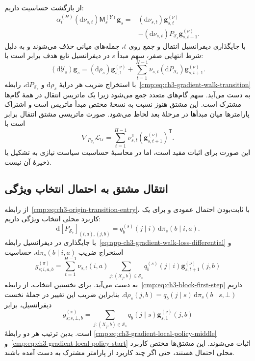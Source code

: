 از بازگشت حساسیت داریم:
\[
\begin{aligned}
\alpha_t^{(H)}(\mathrm d\nu_{s,t})
\mathsf M_s^{(Y)}\mathbf g_s
={}&(\mathrm d\nu_{s,t})\mathbf g_{s,t}^{(\nu)}\\
&-(\mathrm d\nu_{s,t})P_{\mathcal S_s}
\mathbf g_{s,t+1}^{(\nu)} .
\end{aligned}
\]
با جایگذاری دیفرانسیل انتقال و جمع روی
$t$، جمله‌های میانی حذف می‌شوند و به دلیل
شرط انتهایی صفر، سهم مبدأ $s$ در دیفرانسیل
تابع هدف برابر است با:
\begin{equation}\label{eq:app-ch3-gradient-walk-loss-differential}
\boxed{
(\mathrm d\mathscr Y_s)\mathbf g_s
=(\mathrm d\rho_s)\mathbf g_{s,1}^{(\nu)}
+\sum_{t=1}^{H-1}\nu_{s,t}
(\mathrm dP_{\mathcal S_s})\mathbf g_{s,t+1}^{(\nu)}.
}
\end{equation}
با استخراج ضریب هر درایهٔ $\mathrm d\rho_s$
و $\mathrm dP_{\mathcal S_s}$،
رابطه~\eqref{cmp:eq:ch3-gradient-walk-transition}
به دست می‌آید. سهم گام‌های متعدد جمع می‌شود
زیرا یک ماتریس انتقال در همهٔ گام‌ها مشترک
است. این مشتق هنوز نسبت به نسخهٔ مختص مبدأ
ماتریس است و اشتراک پارامترها میان مبدأها
در مرحلهٔ بعد لحاظ می‌شود.
صورت ماتریسی مشتق انتقال برابر است با
\[
\nabla_{P_{\mathcal S_s}}\mathcal L_{\mathrm{tr}}
=\sum_{t=1}^{H-1}\nu_{s,t}^{\mathsf T}
(\mathbf g_{s,t+1}^{(\nu)})^{\mathsf T}.
\]
این صورت برای اثبات مفید است، اما در محاسبهٔ
حساسیت سیاست نیازی به تشکیل یا ذخیرهٔ آن نیست.

\subsection{انتقال مشتق به احتمال انتخاب ویژگی}
\label{app:ch3-gradient-walk-local-policy}

از رابطه~\eqref{cmp:eq:ch3-origin-transition-entry}،
با ثابت‌بودن احتمال عمودی و برای یک کاربرد
محلی انتخاب ویژگی داریم:
\[
\mathrm d[P_{\mathcal S_s}]_{(i,a),(j,b)}
=q_b^{(s)}(j\mid i)\,\mathrm d\pi_s(b\mid i,a).
\]
با جایگذاری در دیفرانسیل
رابطه~\eqref{eq:app-ch3-gradient-walk-loss-differential}
و استخراج ضریب $\mathrm d\pi_s(b\mid i,a)$،
حساسیت
\[
g_{s;i,a,b}^{(\pi)}
=\sum_{t=1}^{H-1}\nu_{s,t}(i,a)
\sum_{j:(X_j,b)\in\mathcal S_s}
q_b^{(s)}(j\mid i)\mathbf g_{s,t+1}^{(\nu)}(j,b)
\]
به دست می‌آید. برای نخستین انتخاب، از
رابطه~\eqref{cmp:eq:ch3-block-first-step}
داریم
$\mathrm d\rho_s(j,b)=q_b(j\mid s)
\,\mathrm d\pi_s(b\mid s,\bot)$.
بنابراین ضریب این تغییر در جملهٔ نخست
دیفرانسیل، برابر
\[
g_{s;s,\bot,b}^{(\pi)}
=\sum_{j:(X_j,b)\in\mathcal S_s}
q_b(j\mid s)\mathbf g_{s,1}^{(\nu)}(j,b)
\]
است. بدین ترتیب هر دو رابطهٔ
\eqref{cmp:eq:ch3-gradient-local-policy-middle}
و~\eqref{cmp:eq:ch3-gradient-local-policy-start}
اثبات می‌شوند. این مشتق‌ها مختص کاربرد
محلی احتمال هستند، حتی اگر چند کاربرد از
پارامتر مشترک به دست آمده باشند.

